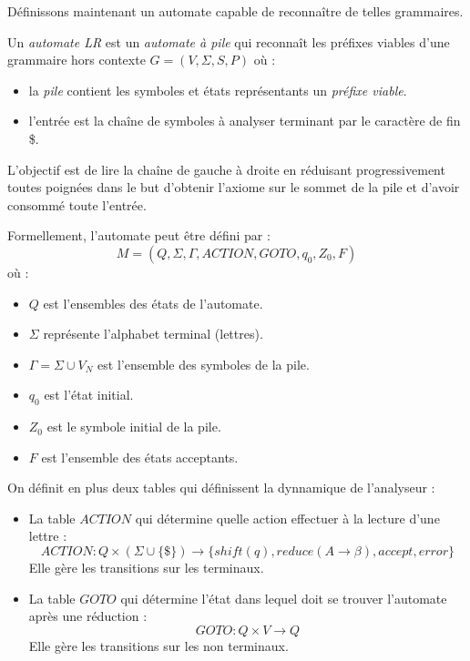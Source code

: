 Définissons maintenant un automate capable de reconnaître de telles grammaires. 

\begin{definition}
    Un \emph{automate LR} est un \emph{automate à pile} qui reconnaît les préfixes viables d'une grammaire 
    hors contexte $ G = (V, \Sigma, S, P)$ où : 
    \begin{itemize}
        \item la \emph{pile} contient les symboles et états représentants un \emph{préfixe viable}. 
        \item l'entrée est la chaîne de symboles à analyser terminant par le caractère de fin \$. 
    \end{itemize}
    L'objectif est de lire la chaîne de gauche à droite en réduisant progressivement toutes poignées 
    dans le but d'obtenir l'axiome sur le sommet de la pile et d'avoir consommé toute l'entrée. 

    Formellement, l'automate peut être défini par : 
        $$ \boxed{ M = (Q, \Sigma, \Gamma, ACTION, GOTO, q_0, Z_0, F)} $$ 
    où : 
    \begin{itemize}
        \item $Q$ est l'ensembles des états de l'automate. 
        \item $ \Sigma$ représente l'alphabet terminal (lettres). 
        \item $ \Gamma = \Sigma \cup V_N$ est l'ensemble des symboles de la pile. 
        \item $q_0$ est l'état initial. 
        \item $Z_0$ est le symbole initial de la pile. 
        \item $F$ est l'ensemble des états acceptants. 
    \end{itemize}
    On définit en plus deux tables qui définissent la dynnamique de l'analyseur : 
    \begin{itemize}
        \item La table $ACTION$ qui détermine quelle action effectuer à la lecture d'une lettre : 
            \[ \boxed{ACTION : Q \times ( \Sigma \cup \{\$\}) \longrightarrow \{shift(q), reduce(A \to \beta), accept, error\} } \] 
        Elle gère les transitions sur les terminaux. 
        \item La table $GOTO$ qui détermine l'état dans lequel doit se trouver l'automate après 
        une réduction : 
            \[ \boxed{GOTO : Q \times V \longrightarrow Q} \] 
        Elle gère les transitions sur les non terminaux. 
    \end{itemize}
\end{definition}


